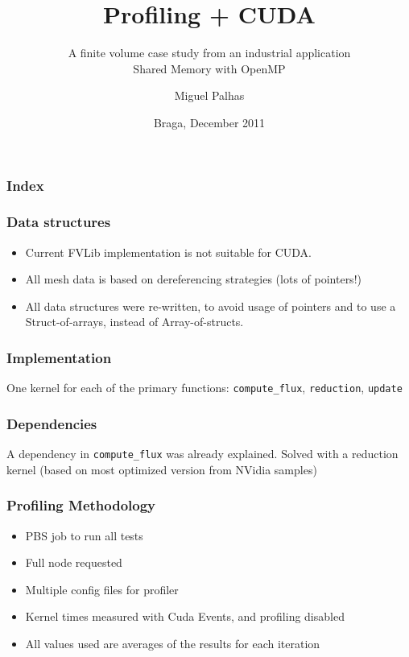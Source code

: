 \documentclass{beamer}
\title{Profiling + CUDA}
\subtitle{A finite volume case study from an industrial application\\\smaller Shared Memory with OpenMP}
\author{Miguel Palhas}
\institute[pg19808]{
	University of Minho \\
	Department of Informatics
}
\date{Braga, December 2011}
\begin{document}

\maketitle%

\begin{frame}
	\frametitle{Index}
	\tableofcontents
\end{frame}

\begin{frame}
	\frametitle{Data structures}

	\begin{itemize}
	\item[] Current FVLib implementation is not suitable for CUDA.
	\item[] All mesh data is based on dereferencing strategies (lots of pointers!)
	\item[] All data structures were re-written, to avoid usage of pointers and to use a Struct-of-arrays, instead of Array-of-structs.
	\end{itemize}
\end{frame}


\begin{frame}
	\frametitle{Implementation}


	One kernel for each of the primary functions: \texttt{compute\_flux}, \texttt{reduction}, \texttt{update}

\end{frame}

\begin{frame}
	\frametitle{Dependencies}

	A dependency in \texttt{compute\_flux} was already explained.
	Solved with a reduction kernel (based on most optimized version from NVidia samples)

\end{frame}

\begin{frame}
	\frametitle{Profiling Methodology}

	\begin{itemize}
		\item PBS job to run all tests
		\item Full node requested
		\item Multiple config files for profiler
		\item Kernel times measured with Cuda Events, and profiling disabled
		\item All values used are averages of the results for each iteration
	\end{itemize}
\end{frame}
\end{document}
